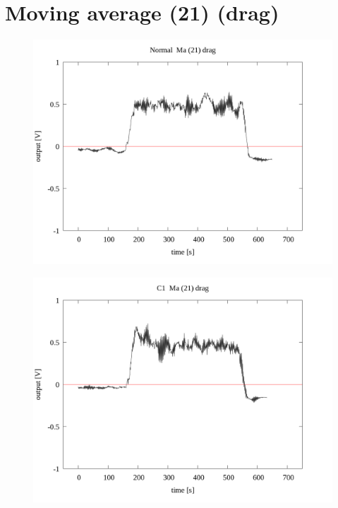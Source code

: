 \documentclass[a4paper]{jsarticle}
\author{}
\title{}
\date{}
\begin{document}
\section{Moving average (21) (drag)}

\begin{figure}[htbp]
    \footnotesize
    \begin{center}
        \includegraphics[width=140mm]{../../../33_result/210806/moving_average/21/drag/Normal_ma(21)_drag.png}
    \end{center}
\end{figure}

\begin{figure}[htbp]
    \footnotesize
    \begin{center}
        \includegraphics[width=140mm]{../../../33_result/210806/moving_average/21/drag/C1_ma(21)_drag.png}
    \end{center}
\end{figure}
\end{document}
